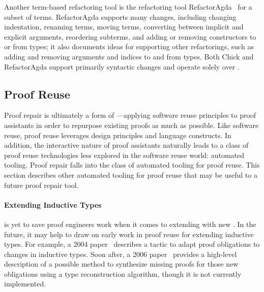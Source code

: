 Another term-based refactoring tool is the refactoring tool RefactorAgda~\cite{wibergh2019} for a subset of  terms.
RefactorAgda supports many changes, including changing indentation, renaming terms, moving terms, converting between implicit and
explicit arguments, reordering subterms, and adding or removing constructors to or from types; 
it also documents ideas for supporting other refactorings, such as adding and removing arguments and indices to and from types.
Both Chick and RefactorAgda support primarily syntactic changes and operate solely over .

\subsection{Proof Reuse}
\label{sec:reuse}

Proof repair is ultimately a form of ---applying software reuse principles to proof assistants
in order to repurpose existing proofs as much as possible.
Like software reuse, proof reuse leverages design principles and language constructs.
In addition, the interactive nature of proof assistants naturally leads to a class of proof reuse technologies less explored
in the software reuse world: automated tooling.
Proof repair falls into the class of automated tooling for proof reuse.
This section describes other automated tooling for proof reuse that may be useful to a future proof repair tool.

\paragraph{Extending Inductive Types} 
\sysnamelong is yet to save proof engineers work when it comes to extending  with new .
In the future, it may help to draw on early work in proof reuse for extending inductive types.
For example, a 2004 paper~\cite{Boite2004} describes a tactic to adapt proof obligations
to changes in inductive types.
Soon after, a 2006 paper~\cite{Mulhern06proofweaving} provides a high-level
description of a possible method to synthesize missing proofs for those new obligations using a type reconstruction algorithm,
though it is not currently implemented.

\iffalse
\paragraph{Proof Planning}
Proof repair tools may also benefit from work in \textit{proof planning}~\cite{Bundy1998}, a proof search technique
that uses plans to guide search for proofs with similar structures.
Proof planning can involve the use of \textit{critics}~\cite{ireland1996},
which reuse information from failing proofs to guide search for correct proofs.
While proof planning was originally designed for use with automated theorem provers, it has also reached
proof assistants.
For example, IsaPlanner~\citep{Dixon2003} is a proof planner for Isabelle with support
for rippling~\citep{shah2005}, a technique for automatic induction.
Rippling has also been implemented in an induction automation
tool for Coq~\citep{wilson2010}.
\fi

